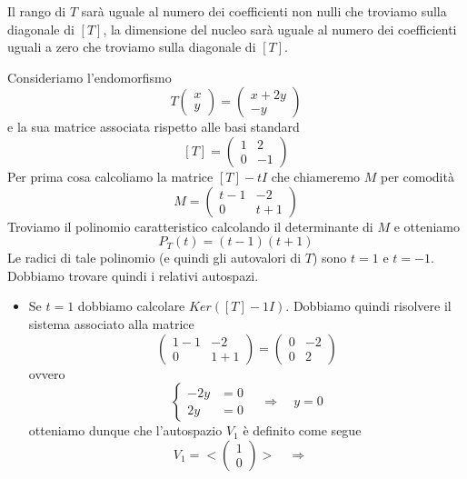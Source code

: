 Il rango di $T$ sar\`a uguale al numero dei coefficienti non nulli che troviamo
sulla diagonale di $[T]$, la dimensione del nucleo sar\`a uguale al numero dei
coefficienti uguali a zero che troviamo sulla diagonale di $[T]$.

\begin{example}
	Consideriamo l'endomorfismo
	\[
		T \begin{pmatrix} x \\ y \end{pmatrix} =
		\begin{pmatrix}
			x + 2y \\
			-y
		\end{pmatrix}
	\]
	e la sua matrice associata rispetto alle basi standard
	\[
		[T] = \begin{pmatrix}
			1 & 2  \\
			0 & -1
		\end{pmatrix}
	\]
	Per prima cosa calcoliamo la matrice $[T] - tI$ che chiameremo $M$ per comodit\`a
	\[
		M = \begin{pmatrix}
			t - 1 & -2    \\
			0     & t + 1
		\end{pmatrix}
	\]
	Troviamo il polinomio caratteristico calcolando il determinante di $M$ e otteniamo
	\[
		P_T(t) = (t - 1)(t + 1)
	\]
	Le radici di tale polinomio (e quindi gli autovalori di $T$) sono $t = 1$ e $t = -1$.
	Dobbiamo trovare quindi i relativi autospazi.
	\begin{itemize}
		\item Se $t = 1$ dobbiamo calcolare $Ker([T] - 1I)$. Dobbiamo quindi risolvere il
		      sistema associato alla matrice
		      \[
			      \begin{pmatrix}
				      1 - 1 & -2    \\
				      0     & 1 + 1
			      \end{pmatrix} =
			      \begin{pmatrix}
				      0 & -2 \\
				      0 & 2
			      \end{pmatrix}
		      \]
		      ovvero
		      \[
			      \begin{cases}
				      -2y & = 0 \\
				      2y  & = 0
			      \end{cases} \quad \Rightarrow \quad
			      y = 0
		      \]
		      otteniamo dunque che l'autospazio $V_1$ \`e definito come segue
		      \[
			      V_1 = < \begin{pmatrix} 1 \\ 0 \end{pmatrix} > \quad \Rightarrow \quad
\]
\end{itemize}
\end{example}
